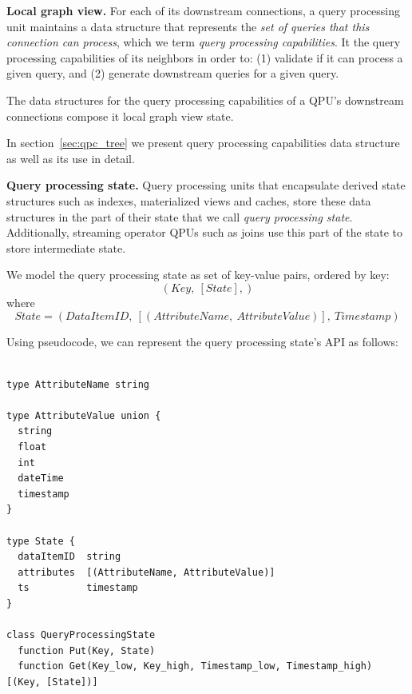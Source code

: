 \medskip
\noindent
\textbf{Local graph view.}
For each of its downstream connections, a query processing unit maintains a data structure that represents the
\textit{set of queries that this connection can process}, which we term \textit{query processing capabilities}.
It the query processing capabilities of its neighbors in order to: (1) validate if it can process a given
query, and (2) generate downstream queries for a given query.

The data structures for the query processing capabilities of a QPU's downstream connections compose it local graph view
state.

In section~\ref{sec:qpc_tree} we present query processing capabilities data structure as well as its use in detail.

\medskip
\noindent
\textbf{Query processing state.}
Query processing units that encapsulate derived state structures such as indexes, materialized views and
caches, store these data structures in the part of their state that we call \textit{query processing state}.
Additionally, streaming operator QPUs such as joins use this part of the state to store intermediate state.

We model the query processing state as set of key-value pairs, ordered by key:
\[
  (Key,~[State],)
\]
where
\[
  State = (DataItemID,~[(AttributeName,~AttributeValue)],~Timestamp)
\]


Using pseudocode, we can represent the query processing state's API as follows:

\begin{lstlisting}[caption={Pseudocode for the QPU's query processing state},captionpos=b,label={lst:qpustate}]

type AttributeName string

type AttributeValue union {
  string
  float
  int
  dateTime
  timestamp
}

type State {
  dataItemID  string
  attributes  [(AttributeName, AttributeValue)]
  ts          timestamp
}

class QueryProcessingState
  function Put(Key, State)
  function Get(Key_low, Key_high, Timestamp_low, Timestamp_high) [(Key, [State])]
\end{lstlisting}

